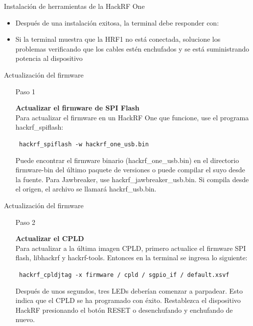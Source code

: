 \begin{frame}{Instalación de  herramientas de la HackRF One}

\begin{itemize}
    \item
    {Después de una instalación exitosa, la terminal debe responder con: \hspace{1pt} }
    \item
    {Si la terminal muestra que la HRF1 no está conectada, solucione los problemas verificando que los cables estén enchufados y se está suministrando potencia al dispositivo}
    
\end{itemize}
\end{frame}

\begin{frame}{Actualización del firmware}

\begin{itemize}
    \item [Paso 1]
    {\textbf {Actualizar el firmware de SPI Flash }\\ Para actualizar el firmware en un HackRF One que funcione, use el programa hackrf\_spiflash:
    
    \begin{block}{}
    \texttt{
    hackrf\_spiflash -w hackrf\_one\_usb.bin}
    \end{block}
    
    Puede encontrar el firmware binario (hackrf\_one\_usb.bin) en el directorio firmware-bin del último paquete de versiones o puede compilar el suyo desde la fuente. Para Jawbreaker, use hackrf\_jawbreaker\_usb.bin. Si compila desde el origen, el archivo se llamará hackrf\_usb.bin. 
    }
    
\end{itemize}
\end{frame}

\begin{frame}{Actualización del firmware}

\begin{itemize}
    \item [Paso 2]
    {\textbf {Actualizar el CPLD}\\ Para actualizar a la última imagen CPLD, primero actualice el firmware SPI flash, libhackrf y hackrf-tools. Entonces en la terminal se ingresa lo siguiente:
    
    \begin{block}{}
    \texttt{
    hackrf\_cpldjtag -x firmware / cpld / sgpio\_if / default.xsvf}
    \end{block}
    
    Después de unos segundos, tres LEDs deberían comenzar a parpadear. Esto indica que el CPLD se ha programado con éxito. Restablezca el dispositivo HackRF presionando el botón RESET o desenchufando y enchufando de nuevo.
    }
    
\end{itemize}
\end{frame}

